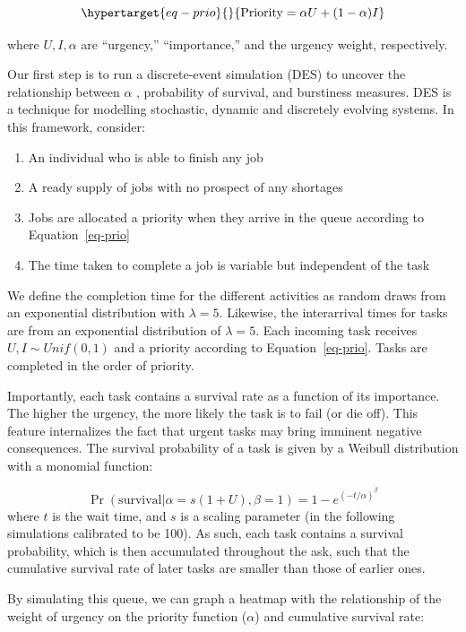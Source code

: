 \documentclass[
]{report}
\begin{document}
\begin{equation}\protect\hypertarget{eq-prio}{}{
\text{Priority} = \alpha U + (1- \alpha) I
}\label{eq-prio}\end{equation}

where \(U, I, \alpha\) are ``urgency,'' ``importance,'' and the urgency
weight, respectively.

Our first step is to run a discrete-event simulation (DES) to uncover
the relationship between \(\alpha\) , probability of survival, and
burstiness measures. DES is a technique for modelling stochastic,
dynamic and discretely evolving systems. In this framework, consider:

\begin{enumerate}
\def\labelenumi{\arabic{enumi}.}
\item
  An individual who is able to finish any job
\item
  A ready supply of jobs with no prospect of any shortages
\item
  Jobs are allocated a priority when they arrive in the queue according
  to Equation~\ref{eq-prio}
\item
  The time taken to complete a job is variable but independent of the
  task
\end{enumerate}

We define the completion time for the different activities as random
draws from an exponential distribution with \(\lambda = 5\). Likewise,
the interarrival times for tasks are from an exponential distribution of
\(\lambda = 5\). Each incoming task receives \(U, I \sim Unif(0,1)\) and
a priority according to Equation~\ref{eq-prio}. Tasks are completed in
the order of priority.

Importantly, each task contains a survival rate as a function of its
importance. The higher the urgency, the more likely the task is to fail
(or die off). This feature internalizes the fact that urgent tasks may
bring imminent negative consequences. The survival probability of a task
is given by a Weibull distribution with a monomial function:

\[
\Pr (\text{survival}|\alpha = s(1+U),\beta=1) = 1 - e^{(-t/\alpha)^\beta}
\] where \(t\) is the wait time, and \(s\) is a scaling parameter (in
the following simulations calibrated to be 100). As such, each task
contains a survival probability, which is then accumulated throughout
the ask, such that the cumulative survival rate of later tasks are
smaller than those of earlier ones.

By simulating this queue, we can graph a heatmap with the relationship
of the weight of urgency on the priority function (\(\alpha\)) and
cumulative survival rate:
\end{document}
